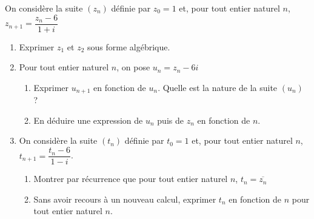 \documentclass[11pt,fleqn, openany]{book} %
\begin{document}
\begin{exercise}[topic=cpx03]On considère la suite $(z_n)$ définie par $z_0=1$ et, pour tout entier naturel $n$, $z_{n+1}=\dfrac{z_n-6}{1+i}$
\begin{enumerate}
\item Exprimer $z_1$ et $z_2$ sous forme algébrique.
\item Pour tout entier naturel $n$, on pose $u_n=z_n-6i$
\begin{enumerate}
\item Exprimer $u_{n+1}$ en fonction de $u_n$. Quelle est la nature de la suite $(u_n)$ ?
\item En déduire une expression de $u_n$ puis de $z_n$ en fonction de $n$.
\end{enumerate}
\item On considère la suite $(t_n)$ définie par $t_0=1$ et, pour tout entier naturel $n$, $t_{n+1}=\dfrac{t_n-6}{1-i}$. 
\begin{enumerate}
\item Montrer par récurrence que pour tout entier naturel $n$, $t_n = \overline{z_n}$
\item Sans avoir recours à un nouveau calcul, exprimer $t_n$ en fonction de $n$ pour tout entier naturel $n$.
\end{enumerate}\end{enumerate}\end{exercise}
\end{document}
